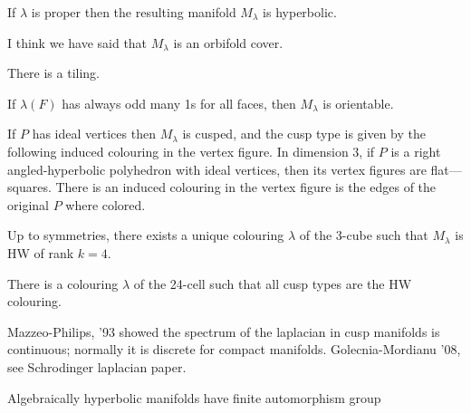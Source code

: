 \begin{prop}\leavevmode
	If $\lambda$ is proper then the resulting manifold $M_\lambda$ is hyperbolic.
\end{prop}

\begin{remark}\leavevmode
	I think we have said that $M_\lambda$ is an orbifold cover.
\end{remark}

\begin{remark}[Misha]\leavevmode
	There is a tiling.
\end{remark}

\begin{prop}\leavevmode
If $\lambda(F)$ has always odd many 1s for all faces, then $M_\lambda$ is orientable.
\end{prop}

\begin{prop}\leavevmode
	If $P$ has ideal vertices then $M_\lambda$ is cusped, and the cusp type is given by the following induced colouring in the vertex figure. In dimension 3, if $P$ is a right angled-hyperbolic polyhedron with ideal vertices, then its vertex figures are flat---squares. There is an induced colouring in the vertex figure is the edges of the original $P$ where colored.
\end{prop}

\begin{prop}\leavevmode
	Up to symmetries, there exists a unique colouring $\lambda$ of the 3-cube such that $M_\lambda$ is HW of rank $k=4$.
\end{prop}

\begin{thm}\leavevmode
	There is a colouring $\lambda$ of the 24-cell such that all cusp types are the HW colouring.
\end{thm}

\begin{remark}\leavevmode
	Mazzeo-Philips, '93 showed the spectrum of the laplacian in cusp manifolds is continuous; normally it is discrete for compact manifolds. Golecnia-Mordianu '08, see Schrodinger laplacian paper.
\end{remark}


\clearpage{}
{\Huge Algebraically hyperbolic manifolds have finite automorphism group}

